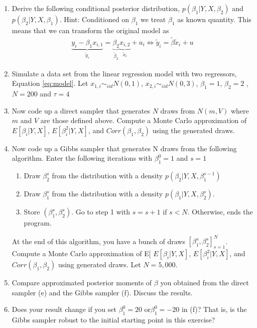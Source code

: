 \documentclass[12pt,onecolumn]{article}
\begin{document}
\begin{enumerate}
\begin{enumerate}
  \item Derive the following conditional posterior distribution, $p(\beta_1|Y,X,\beta_2)$ and $p(\beta_2|Y,X,\beta_1)$. Hint: Conditioned on $\beta_1$ we treat $\beta_1$ as known quantity. This means that we can transform the original model as
  \begin{align}
    \underset{\tilde{y}_{i}}{\underbrace{y_{i}-\beta_{1}x_{i,1}}}=\underset{\tilde{\beta}_{2}}{\underbrace{\beta_{2}}}\underset{\tilde{x}_{i}}{\underbrace{x_{i,2}}}+u_{i}\iff\tilde{y}_{i}=\tilde{\beta}\tilde{x}_{i}+u
  \end{align}
  \item Simulate a data set from the linear regression model with two regressors, Equation \eqref{eq:model}. Let $x_{1,i}\sim_{iid}N(0,1)$, $x_{2,i}\sim_{iid}N(0,3)$, $\beta_1=1$, $\beta_2=2$ , $N =200$ and $\tau= 4$
  \item Now code up a direct sampler that generates $N$ draws from $N(m,V)$ where $m$ and $V$ are those defined above. Compute a Monte Carlo approximation of $E[\beta_i|Y, X]$, $E[\beta^2_i|Y, X]$, and $Corr(\beta_1, \beta_2)$ using the generated draws.
  \item Now code up a Gibbs sampler that generates N draws from the following algorithm. Enter the following iterations with $\beta^{0}_1=1$ and $s=1$
  \begin{enumerate}
    \item Draw $\beta^s_2$ from the distribution with a density $p(\beta_2|Y, X, \beta^{s-1}_1)$
  \item Draw $\beta^s_1$ from the distribution with a density $p(\beta_1|Y, X, \beta^s_2)$.
  \item Store $(\beta^s_1,\beta^s_2)$. Go to step 1 with $s = s+1$ if $s < N$. Otherwise, ends the program.  
  \end{enumerate}
  At the end of this algorithm, you have a bunch of draws $[\beta^s_1,\beta^s_2]^N_{s=1}$. Compute a Monte Carlo approximation of E[ $E[\beta_i|Y, X]$, $E[\beta^2_i|Y, X]$, and $Corr(\beta_1, \beta_2)$  using generated draws. Let $N = 5,000$.
\item  Compare approximated posterior moments of $\beta$ you obtained from the direct sampler (e) and the Gibbs sampler (f). Discuss the results.
\item  Does your result change if you set $\beta^0_1= 20$ or$\beta^0_1= -20$ in (f)? That is, is the Gibbs sampler robust to the initial starting point in this exercise?
\end{enumerate}


\end{enumerate}
\end{document}
